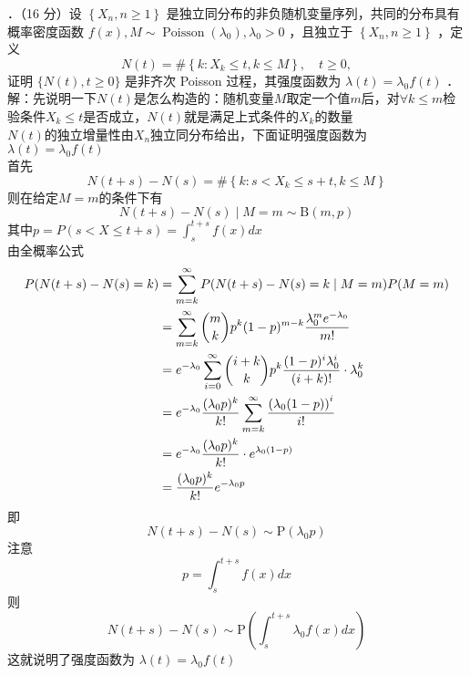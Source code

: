\documentclass[UTF8]{ctexart}
\begin{document}
．（16 分）设 $\left\{X_{n}, n \geq 1\right\}$ 是独立同分布的非负随机变量序列，共同的分布具有概率密度函数 $f(x), M \sim \operatorname{Poisson}\left(\lambda_{0}\right), \lambda_{0}>0$ ，且独立于 $\left\{X_{n}, n \geq 1\right\}$ ，定义
$$
N(t)=\#\left\{k: X_{k} \leq t, k \leq M\right\}, \quad t \geq 0,
$$
证明 $\{N(t), t \geq 0\}$ 是非齐次 Poisson 过程，其强度函数为 $\lambda(t)=\lambda_{0} f(t)$ ．\\
解：先说明一下$N(t)$是怎么构造的：随机变量$M$取定一个值$m$后，对$\forall k \le m$检验条件$X_k \le t$是否成立，$N(t)$就是满足上式条件的$X_k$的数量\\
$N(t)$的独立增量性由$X_n$独立同分布给出，下面证明强度函数为 $\lambda(t)=\lambda_{0} f(t)$\\
首先
\[
N(t+s)-N(s)=\# \left\{k:s< X_{k} \leq s+t, k \leq M\right\}
\]
则在给定$M=m$的条件下有
\[
N(t+s)-N(s) \mid M=m \sim \mathrm{B}(m,p)
\]
其中$p=P(s<X\le t+s)=\int_{s}^{t+s} f(x)dx $\\
由全概率公式
\begin{align*}
	P(N(t+s)-N(s)=k) & = \sum\limits_{m=k}^{\infty}P(N(t+s)-N(s)=k\mid M=m)P(M=m)  \\
	&= \sum\limits_{m=k}^{\infty} \dbinom{m}{k} p^k (1-p)^{m-k}\frac{\lambda_0^m e^{-\lambda_0}}{m!}\\
	&=e^{-\lambda_0}  \sum\limits_{i=0}^{\infty} \dbinom{i+k}{k} p^k \frac{(1-p)^i \lambda_0^i }{(i+k)!}\cdot \lambda_0^k\\
	&=e^{-\lambda_0} \frac{(\lambda_0 p)^k}{k!} \sum\limits_{m=k}^{\infty} \frac{\left(\lambda_0 (1-p) \right)^i }{i!}\\
	&=e^{-\lambda_0} \frac{(\lambda_0 p)^k}{k!} \cdot e^{\lambda_{0}(1-p)}\\
	&=\frac{(\lambda_0 p)^k}{k!} e^{-\lambda_0 p}
\end{align*}
即
\[
N(t+s)-N(s)\sim \mathrm{P}(\lambda_0 p)
\]
注意
\[
p=\int_{s}^{t+s} f(x)dx
\]
则
\[
N(t+s)-N(s)\sim \mathrm{P}\left( \int_{s}^{t+s} \lambda_0 f(x)dx\right) 
\]
这就说明了强度函数为 $\lambda(t)=\lambda_{0} f(t)$\\
\end{document}
